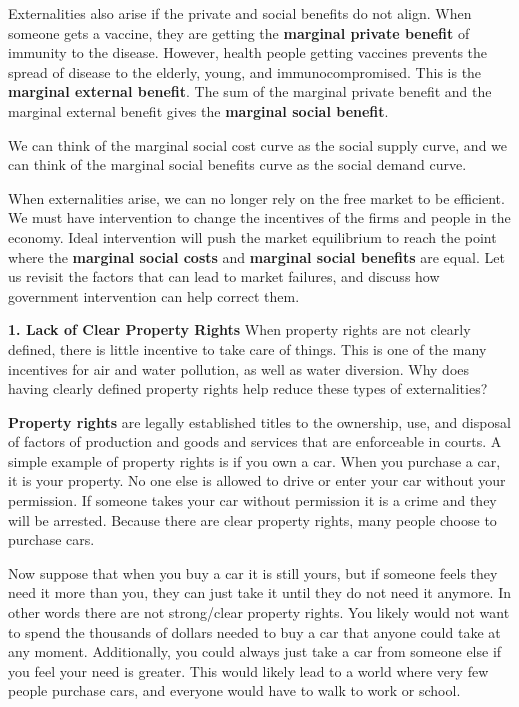 \documentclass[
]{book}
\begin{document}
Externalities also arise if the private and social benefits do not align. When someone gets a vaccine, they are getting the \textbf{marginal private benefit} of immunity to the disease. However, health people getting vaccines prevents the spread of disease to the elderly, young, and immunocompromised. This is the \textbf{marginal external benefit}. The sum of the marginal private benefit and the marginal external benefit gives the \textbf{marginal social benefit}.

We can think of the marginal social cost curve as the social supply curve, and we can think of the marginal social benefits curve as the social demand curve.

When externalities arise, we can no longer rely on the free market to be efficient. We must have intervention to change the incentives of the firms and people in the economy. Ideal intervention will push the market equilibrium to reach the point where the \textbf{marginal social costs} and \textbf{marginal social benefits} are equal. Let us revisit the factors that can lead to market failures, and discuss how government intervention can help correct them.

\textbf{1. Lack of Clear Property Rights}
When property rights are not clearly defined, there is little incentive to take care of things. This is one of the many incentives for air and water pollution, as well as water diversion. Why does having clearly defined property rights help reduce these types of externalities?

\textbf{Property rights} are legally established titles to the ownership, use, and disposal of factors of production and goods and services that are enforceable in courts. A simple example of property rights is if you own a car. When you purchase a car, it is your property. No one else is allowed to drive or enter your car without your permission. If someone takes your car without permission it is a crime and they will be arrested. Because there are clear property rights, many people choose to purchase cars.

Now suppose that when you buy a car it is still yours, but if someone feels they need it more than you, they can just take it until they do not need it anymore. In other words there are not strong/clear property rights. You likely would not want to spend the thousands of dollars needed to buy a car that anyone could take at any moment. Additionally, you could always just take a car from someone else if you feel your need is greater. This would likely lead to a world where very few people purchase cars, and everyone would have to walk to work or school.
\end{document}
